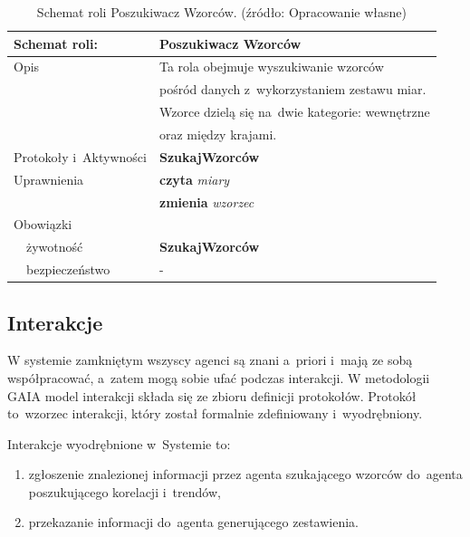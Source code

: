 \documentclass[11pt]{report}
\begin{document}
    \begin{table}[ht!]
        \begin{tabular}{ll}
            Schemat roli:          & Poszukiwacz Wzorców                             \\ \hline
            Opis                   & Ta rola obejmuje wyszukiwanie wzorców           \\
            & pośród danych z~wykorzystaniem zestawu miar.    \\
            & Wzorce dzielą się na~dwie kategorie: wewnętrzne \\
            & oraz między krajami.                            \\
            Protokoły i~Aktywności & \textbf{SzukajWzorców}                          \\
            Uprawnienia            & \textbf{czyta} \textit{miary}                   \\
            & \textbf{zmienia} \textit{wzorzec}               \\
            Obowiązki              &                                                 \\
            ~~żywotność            & \textbf{SzukajWzorców}                          \\
            ~~bezpieczeństwo       & -                                               \\
        \end{tabular}
        \caption{Schemat roli Poszukiwacz Wzorców. (źródło: Opracowanie własne)}
        \label{tab:schemat roli Poszukiwacz Wzorców}
    \end{table}

    \subsection{Interakcje}
    W systemie zamkniętym wszyscy agenci są znani a~priori i~mają ze sobą współpracować, a~zatem mogą sobie ufać podczas interakcji.
    W metodologii GAIA model interakcji składa się ze zbioru definicji protokołów.
    Protokół to~wzorzec interakcji, który został formalnie zdefiniowany i~wyodrębniony.

    Interakcje wyodrębnione w~Systemie to:

    \begin{enumerate}
        \item zgłoszenie znalezionej informacji przez agenta szukającego wzorców do~agenta poszukującego korelacji i~trendów,
        \item przekazanie informacji do~agenta generującego zestawienia.
    \end{enumerate}
\end{document}
